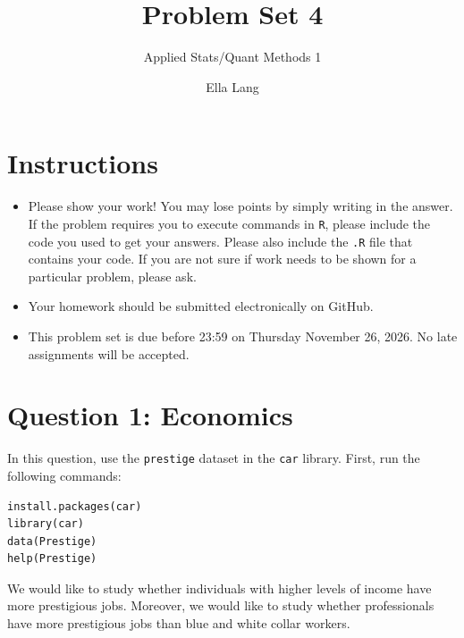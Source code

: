 \documentclass[12pt,letterpaper]{article}
\title{Problem Set 4}
\date{Ella Lang}
\author{Applied Stats/Quant Methods 1}
\begin{document}
	\maketitle
	\section*{Instructions}
	\begin{itemize}
		\item Please show your work! You may lose points by simply writing in the answer. If the problem requires you to execute commands in \texttt{R}, please include the code you used to get your answers. Please also include the \texttt{.R} file that contains your code. If you are not sure if work needs to be shown for a particular problem, please ask.
		\item Your homework should be submitted electronically on GitHub.
		\item This problem set is due before 23:59 on Thursday November 26, 2026. No late assignments will be accepted.
	\end{itemize}



	\vspace{.5cm}
\section*{Question 1: Economics}
\vspace{.25cm}
\noindent 	
In this question, use the \texttt{prestige} dataset in the \texttt{car} library. First, run the following commands:

\begin{verbatim}
install.packages(car)
library(car)
data(Prestige)
help(Prestige)
\end{verbatim} 


\noindent We would like to study whether individuals with higher levels of income have more prestigious jobs. Moreover, we would like to study whether professionals have more prestigious jobs than blue and white collar workers.
\end{document}
